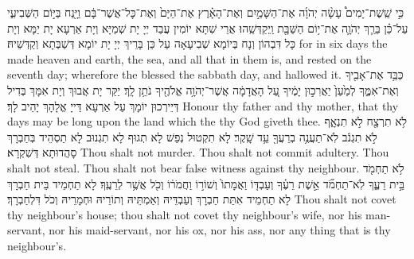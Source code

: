 {כִּ֣י שֵֽׁשֶׁת־יָמִים֩ עָשָׂ֨ה יְהֹוָ֜ה אֶת־הַשָּׁמַ֣יִם וְאֶת־הָאָ֗רֶץ אֶת־הַיָּם֙ וְאֶת־כׇּל־אֲשֶׁר־בָּ֔ם וַיָּ֖נַח בַּיּ֣וֹם הַשְּׁבִיעִ֑י עַל־כֵּ֗ן בֵּרַ֧ךְ יְהֹוָ֛ה אֶת־י֥וֹם הַשַּׁבָּ֖ת וַֽיְקַדְּשֵֽׁהוּ׃\setuma
{}}
{אֲרֵי שִׁתָּא יוֹמִין עֲבַד יְיָ יָת שְׁמַיָּא וְיָת אַרְעָא יָת יַמָּא וְיָת כָּל דִּבְהוֹן וְנָח בְּיוֹמָא שְׁבִיעָאָה עַל כֵּן בָּרֵיךְ יְיָ יָת יוֹמָא דְּשַׁבְּתָא וְקַדְּשֵׁיהּ׃}
{for in six days the \lord\space made heaven and earth, the sea, and all that in them is, and rested on the seventh day; wherefore the \lord\space blessed the sabbath day, and hallowed it.}{}
{כַּבֵּ֥ד אֶת־אָבִ֖יךָ וְאֶת־אִמֶּ֑ךָ לְמַ֙עַן֙ יַאֲרִכ֣וּן יָמֶ֔יךָ עַ֚ל הָאֲדָמָ֔ה אֲשֶׁר־יְהֹוָ֥ה אֱלֹהֶ֖יךָ נֹתֵ֥ן לָֽךְ׃\setuma
{}}
{יַקַּר יָת אֲבוּךְ וְיָת אִמָּךְ בְּדִיל דְּיֵירְכוּן יוֹמָךְ עַל אַרְעָא דַּייָ אֱלָהָךְ יָהֵיב לָךְ׃}
{Honour thy father and thy mother, that thy days may be long upon the land which the \lord\space thy God giveth thee.}{}
{לֹ֥א תִרְצָ֖ח \setuma לֹ֣א תִנְאָ֑ף \setuma לֹ֣א תִגְנֹ֔ב לֹֽא־תַעֲנֶ֥ה בְרֵעֲךָ֖ עֵ֥ד שָֽׁקֶר׃ \setuma
{}}
{לָא תִקְטוּל נְפַשׁ לָא תְגוּף לָא תִגְנוּב לָא תַסְהֵיד בְּחַבְרָךְ סָהֲדוּתָא דְּשִׁקְרָא׃}
{Thou shalt not murder. Thou shalt not commit adultery. Thou shalt not steal. Thou shalt not bear false witness against thy neighbour.}{}
{לֹ֥א תַחְמֹ֖ד בֵּ֣ית רֵעֶ֑ךָ לֹֽא־תַחְמֹ֞ד אֵ֣שֶׁת רֵעֶ֗ךָ וְעַבְדּ֤וֹ וַאֲמָתוֹ֙ וְשׁוֹר֣וֹ וַחֲמֹר֔וֹ וְכֹ֖ל אֲשֶׁ֥ר לְרֵעֶֽךָ׃\petucha}
{לָא תַחְמֵיד בֵּית חַבְרָךְ לָא תַחְמֵיד אִתַּת חַבְרָךְ וְעַבְדֵּיהּ וְאַמְתֵּיהּ וְתוֹרֵיהּ וּחְמָרֵיהּ וְכֹל דִּלְחַבְרָךְ׃}
{Thou shalt not covet thy neighbour’s house; thou shalt not covet thy neighbour’s wife, nor his man-servant, nor his maid-servant, nor his ox, nor his ass, nor any thing that is thy neighbour’s.}{}
